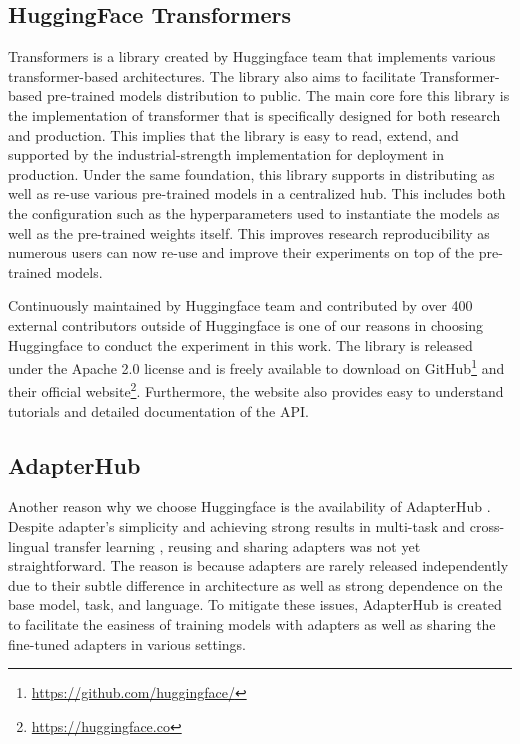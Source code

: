 \subsection{HuggingFace Transformers}
Transformers \cite{wolf2020transformers} is a library created by Huggingface team that implements various transformer-based architectures. The library also aims to facilitate Transformer-based pre-trained models distribution to public. The main core fore this library is the implementation of transformer that is specifically designed for both research and production. This implies that the library is easy to read, extend, and supported by the industrial-strength implementation for deployment in production. Under the same foundation, this library supports in distributing as well as re-use various pre-trained models in a centralized hub. This includes both the configuration such as the hyperparameters used to instantiate the models as well as the pre-trained weights itself. This improves research reproducibility as numerous users can now re-use and improve their experiments on top of the pre-trained models.

Continuously maintained by Huggingface team and contributed by over 400 external contributors outside of Huggingface is one of our reasons in choosing Huggingface to conduct the experiment in this work. The library is released under the Apache 2.0 license and is freely available to download on GitHub\footnote{\url{https://github.com/huggingface/}} and their official website\footnote{\url{https://huggingface.co}}. Furthermore, the website also provides easy to understand tutorials and detailed documentation of the API.

\subsection{AdapterHub}
Another reason why we choose Huggingface is the availability of AdapterHub \cite{pfeiffer-etal-2020-adapterhub}. Despite adapter's simplicity and achieving strong results in multi-task and cross-lingual transfer learning \cite{pfeiffer2021adapterfusion,pfeiffer2020madx}, reusing and sharing adapters was not yet straightforward. The reason is because adapters are rarely released independently due to their subtle difference in architecture as well as strong dependence on the base model, task, and language. To mitigate these issues, AdapterHub is created to facilitate the easiness of training models with adapters as well as sharing the fine-tuned adapters in various settings.


